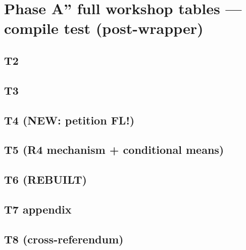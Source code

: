 \documentclass{article}
\begin{document}
\section*{Phase A'' full workshop tables --- compile test (post-wrapper)}

\subsection*{T2}



\subsection*{T3}


\subsection*{T4 (NEW: petition FL!)}



\subsection*{T5 (R4 mechanism + conditional means)}



\subsection*{T6 (REBUILT)}


\subsection*{T7 appendix}


\subsection*{T8 (cross-referendum)}

\end{document}
